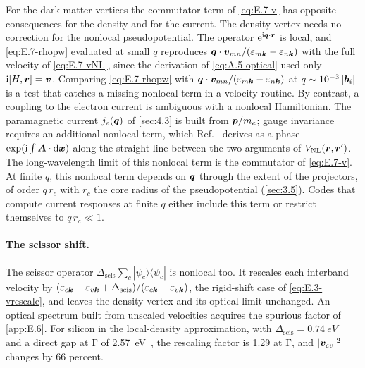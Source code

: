 For the dark-matter vertices the commutator term of \cref{eq:E.7-v} has opposite consequences for the density and for the current. The density vertex needs no correction for the nonlocal pseudopotential. The operator $\mathrm{e}^{\mathrm{i}\bm{q}\cdot\bm{r}}$ is local, and \cref{eq:E.7-rhopw} evaluated at small $q$ reproduces $\bm{q}\cdot\bm{v}_{mn}/(\varepsilon_{m\bm{k}} - \varepsilon_{n\bm{k}})$ with the full velocity of \cref{eq:E.7-vNL}, since the derivation of \cref{eq:A.5-optical} used only $\mathrm{i}[H,\bm{r}] = \bm{v}$. Comparing \cref{eq:E.7-rhopw} with $\bm{q}\cdot\bm{v}_{mn}/(\varepsilon_{m\bm{k}} - \varepsilon_{n\bm{k}})$ at $q \sim 10^{-3}\,|\bm{b}_i|$ is a test that catches a missing nonlocal term in a velocity routine. By contrast, a coupling to the electron current is ambiguous with a nonlocal Hamiltonian. The paramagnetic current $j_e(\bm{q})$ of \cref{sec:4.3} is built from $\bm{p}/m_e$; gauge invariance requires an additional nonlocal term, which Ref.~\cite[Eqs.~(18) and~(19)]{ismailbeigi2001coupling} derives as a phase $\exp(\mathrm{i}\int\bm{A}\cdot\mathrm{d}\bm{x})$ along the straight line between the two arguments of $V_{\mathrm{NL}}(\bm{r},\bm{r}')$. The long-wavelength limit of this nonlocal term is the commutator of \cref{eq:E.7-v}. At finite $q$, this nonlocal term depends on $\bm{q}$ through the extent of the projectors, of order $q\,r_c$ with $r_c$ the core radius of the pseudopotential (\cref{sec:3.5}). Codes that compute current responses at finite $q$ either include this term or restrict themselves to $q\,r_c \ll 1$.

\paragraph{The scissor shift.} The scissor operator $\Delta_{\mathrm{scis}}\sum_c|\psi_c\rangle\langle\psi_c|$ is nonlocal too. It rescales each interband velocity by $(\varepsilon_{c\bm{k}} - \varepsilon_{v\bm{k}} + \Delta_{\mathrm{scis}})/(\varepsilon_{c\bm{k}} - \varepsilon_{v\bm{k}})$, the rigid-shift case of \cref{eq:E.3-vrescale}, and leaves the density vertex and its optical limit unchanged. An optical spectrum built from unscaled velocities acquires the spurious factor of \cref{app:E.6}. For silicon in the local-density approximation, with $\Delta_{\mathrm{scis}} = \SI{0.74}{eV}$~\cite[Sect.~VII]{zacharias2016one} and a direct gap at $\mathrm{\Gamma}$ of \SI{2.57}{eV}~\cite[Table~V]{ponce2015temperature}, the rescaling factor is 1.29 at $\mathrm{\Gamma}$, and $|\bm{v}_{cv}|^2$ changes by 66 percent.

